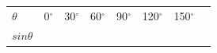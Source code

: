 \begin{center}
\label{m39414*id83562}
\noindent
{}
\tablelasttail{}
\begin{xtabular*}{\mytablewidth}[t]{|p{10\mystarwidth}|p{10\mystarwidth}|p{10\mystarwidth}|p{10\mystarwidth}|p{10\mystarwidth}|p{10\mystarwidth}|p{10\mystarwidth}|p{10\mystarwidth}|}\hline
    $\theta $
    &
0${}^{\circ }$ &
30${}^{\circ }$ &
60${}^{\circ }$ &
90${}^{\circ }$ &
120${}^{\circ }$ &
150${}^{\circ }$ &
\tabularnewline{}
    $sin\theta $
    &
&
&

\end{xtabular*}
\end{center}
